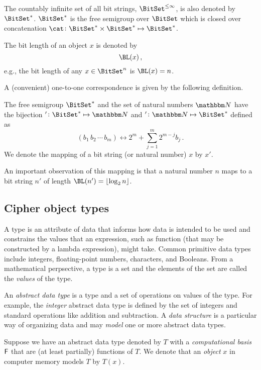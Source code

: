 \documentclass[ ../main.tex]{subfiles}
\begin{document}
The countably infinite set of all bit strings, $\BitSet^{\leq \infty}$, is also denoted by $\BitSet^*$.
$\BitSet^*$ is the free semigroup over $\BitSet$ which is closed over concatenation $\cat \colon {\BitSet^*} \times {\BitSet^*} \mapsto {\BitSet^*}$.


The bit length of an object $x$ is denoted by
\begin{equation}
\BL(x)\,,
\end{equation}
e.g., the bit length of any $x \in \BitSet^n$ is $\BL(x) = n$.

A (convenient) one-to-one correspondence is given by the following definition.
\begin{definition}
\label{def:mapping}
The free semigroup $\BitSet^{*}$ and the set of natural numbers $\NatSet$ have the bijection $' \colon \BitSet^* \mapsto \NatSet$ and $' \colon \NatSet \mapsto \BitSet^*$ defined as
\begin{equation}
	(b_1 \, b_2 \, \cdots \, b_m) \longleftrightarrow 2^m + \sum_{j=1}^{m} 2^{m - j} b_j\,.
\end{equation}
We denote the mapping of a bit string (or natural number) $x$ by $x'$.
\end{definition}
An important observation of this mapping is that a natural number $n$ maps to a bit string $n'$ of length $\BL(n') = \lfloor \log_2 n \rfloor$.

\subsection{Cipher object types}
A type is an attribute of data that informs how data is intended to be used and constrains the values that an expression, such as function (that may be constructed by a lambda expression), might take.
Common primitive data types include integers, floating-point numbers, characters, and Booleans.
From a mathematical perpsective, a type is a set and the elements of the set are called the \emph{values} of the type.

An \emph{abstract data type} is a type and a set of operations on values of the type.
For example, the \emph{integer} abstract data type is defined by the set of integers and standard operations like addition and subtraction.
A \emph{data structure} is a particular way of organizing data and may \emph{model} one or more abstract data types.

Suppose we have an abstract data type denoted by $T$ with a \emph{computational basis} $\Set{F}$ that are (at least partially) functions of $T$.
We denote that an \emph{object} $x$ in computer memory models $T$ by $T(x)$.
\end{document}
